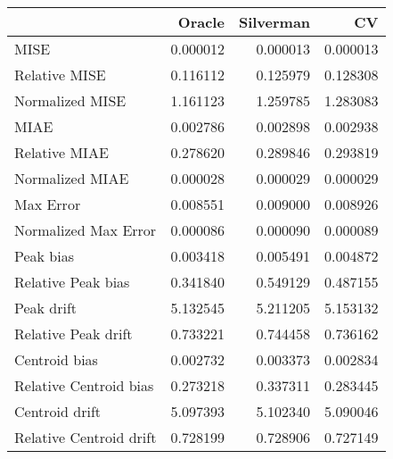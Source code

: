 \begin{tabular}{lrrr}
  \hline
 & Oracle & Silverman & CV \\ 
  \hline
MISE & 0.000012 & 0.000013 & 0.000013 \\ 
  Relative MISE & 0.116112 & 0.125979 & 0.128308 \\ 
  Normalized MISE & 1.161123 & 1.259785 & 1.283083 \\ 
  MIAE & 0.002786 & 0.002898 & 0.002938 \\ 
  Relative MIAE & 0.278620 & 0.289846 & 0.293819 \\ 
  Normalized MIAE & 0.000028 & 0.000029 & 0.000029 \\ 
  Max Error & 0.008551 & 0.009000 & 0.008926 \\ 
  Normalized Max Error & 0.000086 & 0.000090 & 0.000089 \\ 
  Peak bias & 0.003418 & 0.005491 & 0.004872 \\ 
  Relative Peak bias & 0.341840 & 0.549129 & 0.487155 \\ 
  Peak drift & 5.132545 & 5.211205 & 5.153132 \\ 
  Relative Peak drift & 0.733221 & 0.744458 & 0.736162 \\ 
  Centroid bias & 0.002732 & 0.003373 & 0.002834 \\ 
  Relative Centroid bias & 0.273218 & 0.337311 & 0.283445 \\ 
  Centroid drift & 5.097393 & 5.102340 & 5.090046 \\ 
  Relative Centroid drift & 0.728199 & 0.728906 & 0.727149 \\ 
   \hline
\end{tabular}
